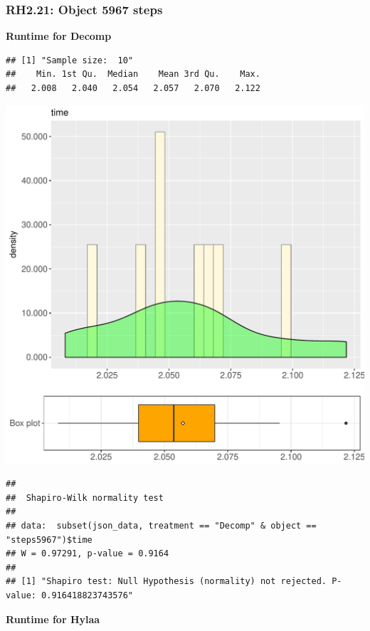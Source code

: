 \documentclass{article}\usepackage[]{graphicx}\usepackage[]{color}
\makeatletter
\def\maxwidth{ %
  \ifdim\Gin@nat@width>\linewidth
    \linewidth
  \else
    \Gin@nat@width
  \fi
}
\newenvironment{kframe}{%
 \def\at@end@of@kframe{}%
 \ifinner\ifhmode%
  \def\at@end@of@kframe{\end{minipage}}%
  \begin{minipage}{\columnwidth}%
 \fi\fi%
 \def\FrameCommand##1{\hskip\@totalleftmargin \hskip-\fboxsep
 \colorbox{shadecolor}{##1}\hskip-\fboxsep
     \hskip-\linewidth \hskip-\@totalleftmargin \hskip\columnwidth}%
 \MakeFramed {\advance\hsize-\width
   \@totalleftmargin\z@ \linewidth\hsize
   \@setminipage}}%
 {\par\unskip\endMakeFramed%
 \at@end@of@kframe}
\newenvironment{knitrout}{}{} %
\makeatother
\begin{document}
\subsubsection{RH2.21: Object 5967 steps}

 \textbf{Runtime for Decomp}
\begin{knitrout}
\color{fgcolor}\begin{kframe}
\begin{verbatim}
## [1] "Sample size:  10"
##    Min. 1st Qu.  Median    Mean 3rd Qu.    Max. 
##   2.008   2.040   2.054   2.057   2.070   2.122
\end{verbatim}
\end{kframe}
\includegraphics[width=\maxwidth]{figure/RH2_Decomp_steps5967-1} 
\begin{kframe}\begin{verbatim}
## 
## 	Shapiro-Wilk normality test
## 
## data:  subset(json_data, treatment == "Decomp" & object == "steps5967")$time
## W = 0.97291, p-value = 0.9164
## 
## [1] "Shapiro test: Null Hypothesis (normality) not rejected. P-value: 0.916418823743576"
\end{verbatim}
\end{kframe}
\end{knitrout}
 \textbf{Runtime for Hylaa}
\end{document}
